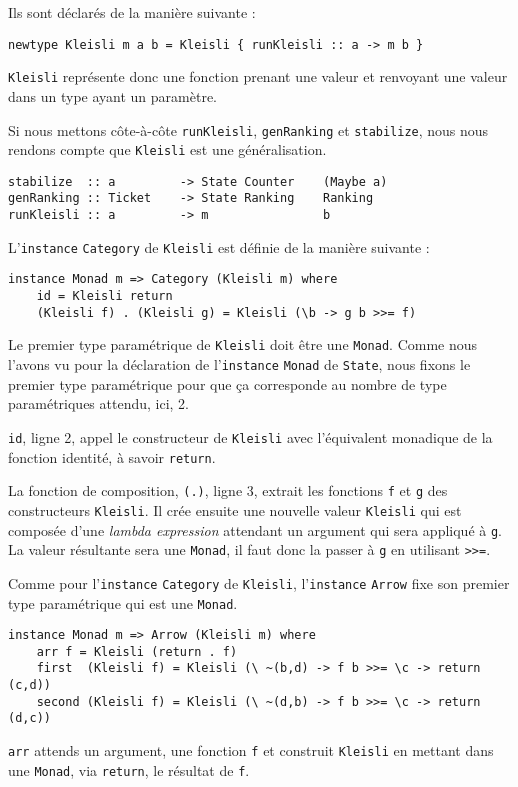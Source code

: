 \documentclass{llncs}
\begin{document}
Ils sont déclarés de la manière suivante :
\begin{lstlisting}
newtype Kleisli m a b = Kleisli { runKleisli :: a -> m b }
\end{lstlisting}

\lstinline{Kleisli} représente donc une fonction prenant une valeur et renvoyant
une valeur dans un type ayant un paramètre.

Si nous mettons côte-à-côte \lstinline{runKleisli}, \lstinline{genRanking} et
\lstinline{stabilize}, nous nous rendons compte que \lstinline{Kleisli} est une
généralisation.
\begin{lstlisting}
stabilize  :: a         -> State Counter    (Maybe a)
genRanking :: Ticket    -> State Ranking    Ranking
runKleisli :: a         -> m                b
\end{lstlisting}

L'\lstinline{instance} \lstinline{Category} de \lstinline{Kleisli} est
définie de la manière suivante :
\begin{lstlisting}
instance Monad m => Category (Kleisli m) where
    id = Kleisli return
    (Kleisli f) . (Kleisli g) = Kleisli (\b -> g b >>= f)
\end{lstlisting}
Le premier type paramétrique de \lstinline{Kleisli} doit être une \lstinline{Monad}.
Comme nous l'avons vu pour la déclaration de l'\lstinline{instance} \lstinline{Monad}
de \lstinline{State}, nous fixons le premier type paramétrique pour que ça corresponde
au nombre de type paramétriques attendu, ici, 2.

\lstinline{id}, ligne 2, appel le constructeur de \lstinline{Kleisli} avec
l'équivalent monadique de la fonction identité, à savoir \lstinline{return}.

La fonction de composition, \lstinline{(.)}, ligne 3, extrait les fonctions
\lstinline{f} et \lstinline{g} des constructeurs \lstinline{Kleisli}.
Il crée ensuite une nouvelle valeur \lstinline{Kleisli} qui est composée d'une
\emph{lambda expression} attendant un argument qui sera appliqué à \lstinline{g}.
La valeur résultante sera une \lstinline{Monad}, il faut donc la passer à \lstinline{g}
en utilisant \lstinline{>>=}.

Comme pour l'\lstinline{instance} \lstinline{Category} de \lstinline{Kleisli},
l'\lstinline{instance} \lstinline{Arrow} fixe son premier type paramétrique qui
est une \lstinline{Monad}.
\begin{lstlisting}
instance Monad m => Arrow (Kleisli m) where
    arr f = Kleisli (return . f)
    first  (Kleisli f) = Kleisli (\ ~(b,d) -> f b >>= \c -> return (c,d))
    second (Kleisli f) = Kleisli (\ ~(d,b) -> f b >>= \c -> return (d,c))
\end{lstlisting}
\lstinline{arr} attends un argument, une fonction \lstinline{f} et construit
\lstinline{Kleisli} en mettant dans une \lstinline{Monad}, via \lstinline{return},
le résultat de \lstinline{f}.
\end{document}
